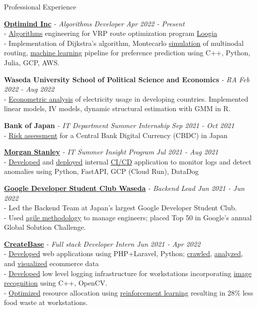 \documentclass{resume} %
\begin{document}
\begin{rSection}{Professional Experience}

{\bf \href{https://www.optimind.tech/}{Optimind Inc}} {\textit{- Algorithms Developer }} \hfill {\em Apr 2022 - Present} 
\\- \uline{Algorithms} engineering for VRP route optimization program \href{https://loogia.jp/?_ga=2.72237267.1726635224.1669133714-1962149220.1665458028}{Loogia}
\\- Implementation of Dijkstra's algorithm, Montecarlo \uline{simulation} of multinodal routing, \uline{machine learning} pipeline for preference prediction using C++, Python, Julia, GCP, AWS. 

{\bf Waseda University School of Political Science and Economics} {\textit{ - RA }} \hfill {\em Feb 2022 - Aug 2022} 
\\- \uline{Econometric analysis} of electricity usage in developing countries. Implemented linear models, IV models, dynamic structural estimation with GMM in R. 

{\bf Bank of Japan}{\textit{ - IT Department Summer Internship}} \hfill {\em Sep 2021 - Oct 2021} 
\\- \uline{Risk assessment} for a Central Bank Digital Currency (CBDC) in Japan 

{\bf \href{https://www.morganstanley.co.jp/ja}{Morgan Stanley}}\textit{ - IT Summer Insight Program} \hfill {\em Jul 2021 - Aug 2021} 
\\- \uline{Developed} and \uline{deployed} internal \uline{CI/CD} application to monitor logs and detect anomalies using Python, FastAPI, GCP (Cloud Run), DataDog

{ \bf\href{https://gdsc.community.dev/waseda-university/}{Google Developer Student Club Waseda}} \textit{ - Backend Lead \hfill {Jun 2021 - Jun 2022}}
\\- Led the Backend Team at Japan's largest Google Developer Student Club. 
\\- Used \uline{agile methodology} to manage engineers; placed Top 50 in Google's annual Global Solution Challenge. 

{\bf \href{https://createbase.work/}{CreateBase}} {\textit{- Full stack Developer Intern }} \hfill {\em Jun 2021 - Apr 2022} 
\\- \uline{Developed} web applications using PHP+Laravel, Python; \uline{crawled}, \uline{analyzed}, and \uline{visualized} ecommerce data
\\- \uline{Developed} low level logging infrastructure for workstations incorporating \uline{image recognition} using C++, OpenCV.
\\- \uline{Optimized} resource allocation using \uline{reinforcement learning} resulting in 28\% less food waste at workstations. 

\end{rSection}
\end{document}
